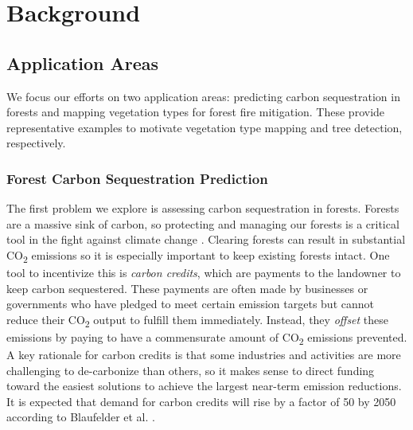 \chapter{Background} \label{chapBackground}
\section{Application Areas}
We focus our efforts on two application areas: predicting carbon sequestration in forests and mapping vegetation types for forest fire mitigation. These provide representative examples to motivate vegetation type mapping and tree detection, respectively. 
\subsection{Forest Carbon Sequestration Prediction}
The first problem we explore is assessing carbon sequestration in forests. Forests are a massive sink of carbon, so protecting and managing our forests is a critical tool in the fight against climate change \cite{Griscom2017NaturalSolutions}. 
Clearing forests can result in substantial CO\textsubscript{2} emissions so it is especially important to keep existing forests intact. 
One tool to incentivize this is \textit{carbon credits}, which are payments to the landowner to keep carbon sequestered. These payments are often made by businesses or governments who have pledged to meet certain emission targets but cannot reduce their  CO\textsubscript{2} output to fulfill them immediately. Instead, they \textit{offset} these emissions by paying to have a commensurate amount of CO\textsubscript{2} emissions prevented. A key rationale for carbon credits is that some industries and activities are more challenging to de-carbonize than others, so it makes sense to direct funding toward the easiest solutions to achieve the largest near-term emission reductions. 
It is expected that demand for carbon credits will rise by a factor of 50 by 2050 according to Blaufelder et al. \cite{Blaufelder2021AChallenge}. 

